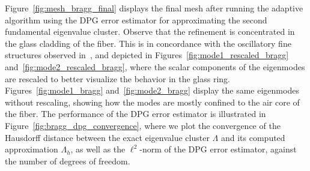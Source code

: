 \documentclass[12pt, oneside, reqno]{amsart}
\theoremstyle{remark}
\begin{document}
Figure~\ref{fig:mesh_bragg_final} displays the final mesh after
running the adaptive algorithm using the DPG error estimator for
approximating the second fundamental eigenvalue cluster.
Observe that the refinement is concentrated in the glass cladding of the
fiber.
This is in concordance with the oscillatory fine structures observed
in~\cite{VanGopGro2023-1}, and depicted in Figures~\ref{fig:mode1_rescaled_bragg}
and~\ref{fig:mode2_rescaled_bragg}, where the scalar components of the
eigenmodes are rescaled to better visualize the behavior in the glass ring.
Figures~\ref{fig:mode1_bragg} and~\ref{fig:mode2_bragg} display the same
eigenmodes without
rescaling, showing how the modes are mostly confined to the
air core of the fiber.
The performance of the DPG error estimator is illustrated in
Figure~\ref{fig:bragg_dpg_convergence}, where we plot the convergence of the
Hausdorff distance between the exact eigenvalue cluster \(\varLambda\) and
its computed approximation \(\varLambda_h\), as well as the
\(\ell^2\)-norm of the DPG error estimator, against the number of degrees of
freedom.
\end{document}
